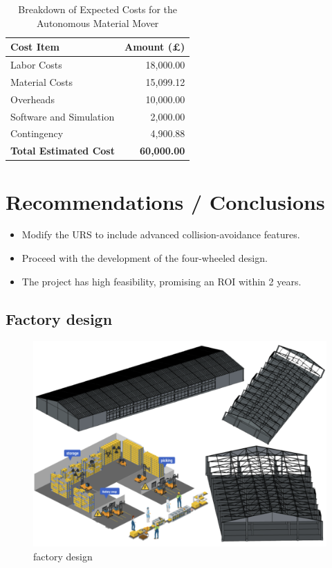 \documentclass[12pt]{article}
\begin{document}
\begin{table}[h!]
    \centering
    \begin{tabular}{|l|r|}
        \hline
        \textbf{Cost Item}          & \textbf{Amount (£)} \\ \hline
        Labor Costs                 & 18,000.00           \\ \hline
        Material Costs              & 15,099.12           \\ \hline
        Overheads                   & 10,000.00           \\ \hline
        Software and Simulation     & 2,000.00            \\ \hline
        Contingency                 & 4,900.88            \\ \hline
        \textbf{Total Estimated Cost} & \textbf{60,000.00}  \\ \hline
    \end{tabular}
    \caption{Breakdown of Expected Costs for the Autonomous Material Mover}
    \label{tab:expected_costs}
\end{table}


\section{Recommendations / Conclusions}
\begin{itemize}
    \item Modify the URS to include advanced collision-avoidance features.
    \item Proceed with the development of the four-wheeled design.
    \item The project has high feasibility, promising an ROI within 2 years.
\end{itemize}




\subsection{Factory design}
\begin{figure}[h!]
    \centering
    \includegraphics[width=0.5\linewidth]{factory layout1.png}
    \caption{factory design}
    \label{fig:targeted working condition}
\end{figure}
\newpage
\end{document}
